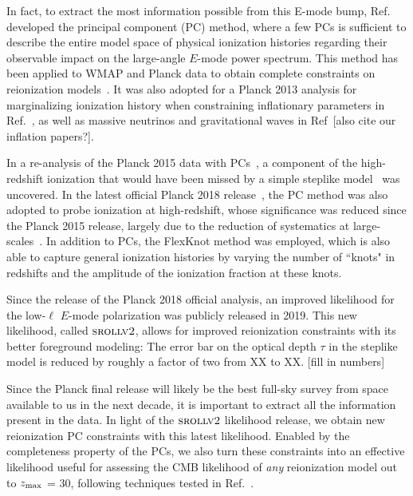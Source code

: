 \documentclass[prd,twocolumn,amsmath,amssymb,floatfix,superscriptaddress,nofootinbib]{revtex4-1}
\newcommand{\zmax}{z_{\rm max}}
\begin{document}
In fact, to extract the most information possible from this E-mode bump, Ref.~\cite{Hu:2003gh, Mortonson:2007hq} developed the principal component (PC) method, where a few PCs is sufficient to describe the entire model space of physical ionization histories regarding their observable impact on the large-angle $E$-mode power spectrum. This method has been applied to WMAP and Planck data to obtain complete constraints on reionization models~\cite{Mortonson:2008rx, Mortonson:2007hq, Heinrich:2016ojb, Aghanim:2018eyx}. It was also adopted for a Planck 2013 analysis for marginalizing ionization history when constraining inflationary parameters in Ref.~\cite{Planck:2013jfk}, as well as massive neutrinos and gravitational waves in Ref~\cite{Dai:2015dwa}[also cite our inflation papers?]. 

In a re-analysis of the Planck 2015 data with PCs~\cite{Heinrich:2016ojb}, a component of the high-redshift ionization that would have been missed by a simple steplike model~\cite{Heinrich:2016ojb} was uncovered. In the latest official Planck 2018 release~\cite{Aghanim:2018eyx}, the PC method was also adopted to probe ionization at high-redshift, whose significance was reduced since the Planck 2015 release, largely due to the reduction of systematics at large-scales~\cite{Aghanim:2018eyx, Heinrich:2018btc}. In addition to PCs, the FlexKnot method was employed, which is also able to capture general ionization histories by varying the number of ``knots" in redshifts and the amplitude of the ionization fraction at these knots. 

Since the release of the Planck 2018 official analysis, an improved likelihood for the low-$\ell$ $E$-mode polarization was publicly released in 2019. This new likelihood, called $\textsc{srollv2}$, allows for improved reionization constraints with its better foreground modeling: The error bar on the optical depth $\tau$ in the steplike model is reduced by roughly a factor of two from XX to XX. [fill in numbers]

Since the Planck final release will likely be the best full-sky survey from space available to us in the next decade, it is important to extract all the information present in the data. In light of the $\textsc{srollv2}$ likelihood release, we obtain new reionization PC constraints with this latest likelihood. Enabled by the completeness property of the PCs, we also turn these constraints into an effective likelihood useful for assessing the CMB likelihood of \textit{any} reionization model out to $\zmax$ = 30, following techniques tested in Ref.~\cite{Heinrich:2016ojb}. 
\end{document}
